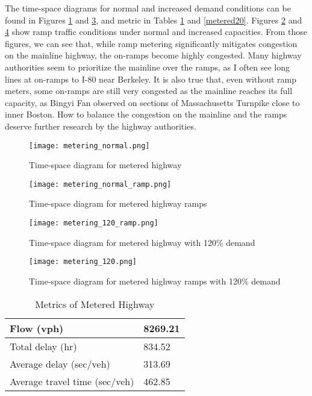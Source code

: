 \documentclass{article}
\begin{document}
The time-space diagrams for normal and increased demand conditions can be found in Figures \ref{fig:meter} and \ref{fig:meter120}, and metric in Tables \ref{metered} and \ref{metered20}. Figures \ref{fig:meter_ramp} and \ref{fig:meter120ramp} show ramp traffic conditions under normal and increased capacities. From those figures, we can see that, while ramp metering significantly mitigates congestion on the mainline highway, the on-ramps become highly congested. Many highway authorities seem to prioritize the mainline over the ramps, as I often see long lines at on-ramps to I-80 near Berkeley. It is also true that, even without ramp meters, some on-ramps are still very congested as the mainline reaches its full capacity, as Bingyi Fan observed on sections of Massachusetts Turnpike close to inner Boston. How to balance the congestion on the mainline and the ramps deserve further research by the highway authorities.

\begin{figure}
    \centering
    \texttt{[image: metering\_normal.png]}
    \caption{Time-space diagram for metered highway}
    \label{fig:meter}
\end{figure}
\begin{figure}
    \centering
    \texttt{[image: metering\_normal\_ramp.png]}
    \caption{Time-space diagram for metered highway ramps}
    \label{fig:meter_ramp}
\end{figure}

\begin{figure}
    \centering
    \texttt{[image: metering\_120\_ramp.png]}
    \caption{Time-space diagram for metered highway with 120\% demand}
    \label{fig:meter120}
\end{figure}
\begin{figure}
    \centering
    \texttt{[image: metering\_120.png]}
    \caption{Time-space diagram for metered highway ramps with 120\% demand}
    \label{fig:meter120ramp}
\end{figure}


\begin{table}[]
\centering
\caption{Metrics of Metered Highway}
\begin{tabular}{|l|l|}
\hline
Flow (vph)                    & 8269.21 \\ \hline
Total delay (hr)              & 834.52  \\ \hline
Average delay (sec/veh)       & 313.69  \\ \hline
Average travel time (sec/veh) & 462.85  \\ \hline
\end{tabular}
\label{metered}
\end{table}
\end{document}
